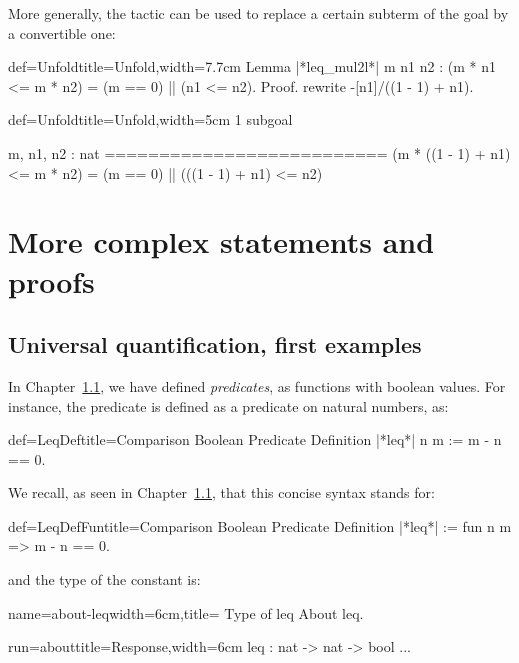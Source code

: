 More generally, the  tactic can be used to replace a
certain subterm of the goal by a convertible one:

\begin{coq}{def=Unfold}{title=Unfold,width=7.7cm}
Lemma |*leq_mul2l*| m n1 n2 :
(m * n1 <= m * n2) = (m == 0) || (n1 <= n2).
Proof.
rewrite -[n1]/((1 - 1) + n1).
\end{coq}
\begin{coqout}{def=Unfold}{title=Unfold,width=5cm}
1 subgoal

m, n1, n2 : nat
==========================
(m * ((1 - 1) + n1) <= m * n2) =
(m == 0) || (((1 - 1) + n1) <= n2)
\end{coqout}




\section{More complex statements and proofs}

\subsection{Universal quantification, first examples}

In Chapter~\ref{}, we have defined \emph{predicates}, as functions
with boolean values. For instance, the  predicate is defined as
a predicate on natural numbers, as:

\begin{coq}{def=LeqDef}{title=Comparison Boolean Predicate}
Definition |*leq*| n m := m - n == 0.
\end{coq}

We recall, as seen in Chapter~\ref{}, that this concise syntax stands
for:

\begin{coq}{def=LeqDefFun}{title=Comparison Boolean Predicate}
Definition |*leq*| := fun n m => m - n == 0.
\end{coq}
and the type of the constant  is:

\begin{coq}{name=about-leq}{width=6cm,title= Type of leq}
About leq.
\end{coq}
\begin{coqout}{run=about}{title=Response,width=6cm}
leq : nat -> nat -> bool
...
\end{coqout}

